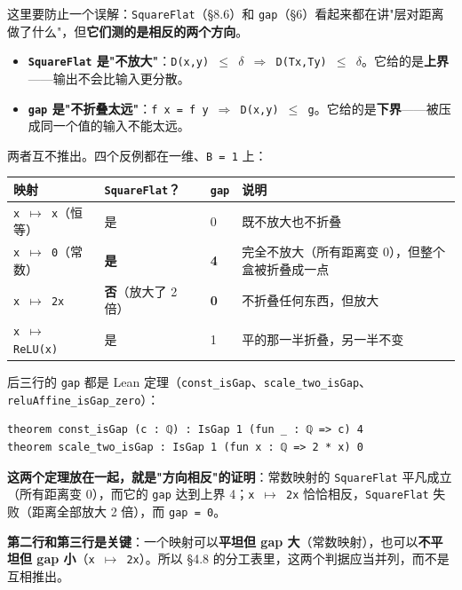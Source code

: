 \documentclass[11pt,a4paper]{ctexart}
\begin{document}
这里要防止一个误解：\texttt{SquareFlat}（§8.6）和 \texttt{gap}（§6）看起来都在讲"层对距离做了什么"，但\textbf{它们测的是相反的两个方向}。

\begin{itemize}
\item \textbf{\texttt{SquareFlat} 是"不放大"}：\texttt{D(x,y) \ensuremath{\le} \ensuremath{\delta} \ensuremath{\Longrightarrow} D(Tx,Ty) \ensuremath{\le} \ensuremath{\delta}}。它给的是\textbf{上界}——输出不会比输入更分散。
\item \textbf{\texttt{gap} 是"不折叠太远"}：\texttt{f x = f y \ensuremath{\Longrightarrow} D(x,y) \ensuremath{\le} g}。它给的是\textbf{下界}——被压成同一个值的输入不能太远。
\end{itemize}

两者互不推出。四个反例都在一维、\texttt{B = 1} 上：

\begin{center}\small
\begin{tabular}{llll}
\toprule
映射 & \texttt{SquareFlat}？ & \texttt{gap} & 说明 \\
\midrule
\texttt{x \ensuremath{\mapsto} x}（恒等） & 是 & 0 & 既不放大也不折叠 \\
\texttt{x \ensuremath{\mapsto} 0}（常数） & \textbf{是} & \textbf{4} & 完全不放大（所有距离变 0），但整个盒被折叠成一点 \\
\texttt{x \ensuremath{\mapsto} 2x} & \textbf{否}（放大了 2 倍） & \textbf{0} & 不折叠任何东西，但放大 \\
\texttt{x \ensuremath{\mapsto} ReLU(x)} & 是 & 1 & 平的那一半折叠，另一半不变 \\
\bottomrule
\end{tabular}
\end{center}

后三行的 \texttt{gap} 都是 Lean 定理（\texttt{const\_isGap}、\texttt{scale\_two\_isGap}、\texttt{reluAffine\_isGap\_zero}）：

\begin{lstlisting}
theorem const_isGap (c : ℚ) : IsGap 1 (fun _ : ℚ => c) 4
theorem scale_two_isGap : IsGap 1 (fun x : ℚ => 2 * x) 0
\end{lstlisting}

\textbf{这两个定理放在一起，就是"方向相反"的证明}：常数映射的 \texttt{SquareFlat} 平凡成立（所有距离变 0），而它的 \texttt{gap} 达到上界 4；\texttt{x \ensuremath{\mapsto} 2x} 恰恰相反，\texttt{SquareFlat} 失败（距离全部放大 2 倍），而 \texttt{gap = 0}。

\textbf{第二行和第三行是关键}：一个映射可以\textbf{平坦但 gap 大}（常数映射），也可以\textbf{不平坦但 gap 小}（\texttt{x \ensuremath{\mapsto} 2x}）。所以 §4.8 的分工表里，这两个判据应当并列，而不是互相推出。
\end{document}
